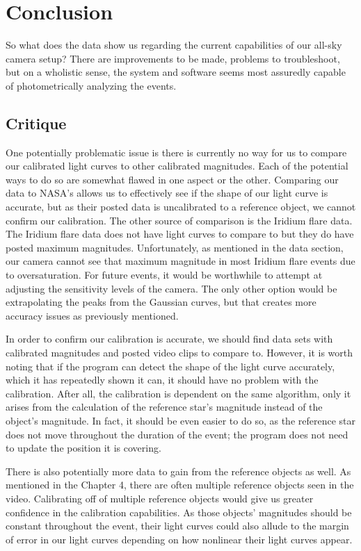 \chapter{Conclusion}

So what does the data show us regarding the current capabilities of our all-sky camera setup? There are improvements to be made, problems to troubleshoot, but on a wholistic sense, the system and software seems most assuredly capable of photometrically analyzing the events.

\section{Critique}
One potentially problematic issue is there is currently no way for us to compare our calibrated light curves to other calibrated magnitudes. Each of the potential ways to do so are somewhat flawed in one aspect or the other. Comparing our data to NASA's allows us to effectively see if the shape of our light curve is accurate, but as their posted data is uncalibrated to a reference object, we cannot confirm our calibration. The other source of comparison is the Iridium flare data. The Iridium flare data does not have light curves to compare to but they do have posted maximum magnitudes. Unfortunately, as mentioned in the data section, our camera cannot see that maximum magnitude in most Iridium flare events due to oversaturation. For future events, it would be worthwhile to attempt at adjusting the sensitivity levels of the camera. The only other option would be extrapolating the peaks from the Gaussian curves, but that creates more accuracy issues as previously mentioned.

In order to confirm our calibration is accurate, we should find data sets with calibrated magnitudes and posted video clips to compare to. However, it is worth noting that if the program can detect the shape of the light curve accurately, which it has repeatedly shown it can, it should have no problem with the calibration. After all, the calibration is dependent on the same algorithm, only it arises from the calculation of the reference star's magnitude instead of the object's magnitude. In fact, it should be even easier to do so, as the reference star does not move throughout the duration of the event; the program does not need to update the position it is covering. 

There is also potentially more data to gain from the reference objects as well. As mentioned in the Chapter 4, there are often multiple reference objects seen in the video. Calibrating off of multiple reference objects would give us greater confidence in the calibration capabilities. As those objects' magnitudes should be constant throughout the event, their light curves could also allude to the margin of error in our light curves depending on how nonlinear their light curves appear.

